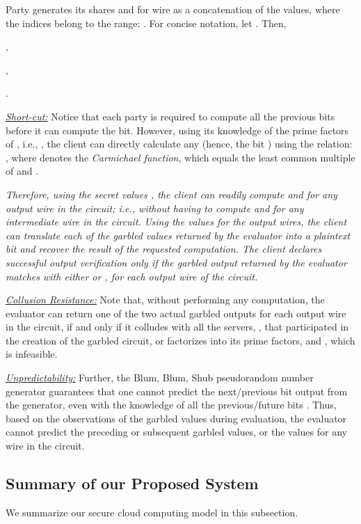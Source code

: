\documentclass[10pt,journal,cspaper,compsoc]{IEEEtran}
\begin{document}
Party  generates its shares  and  for wire  as a concatenation of the  values, where the indices  belong to the range: . For concise notation, let . Then,


,


,


.


\underline{\em Short-cut:} Notice that each party  is required to compute all the previous  bits before it can compute the  bit. However, using its knowledge of the prime factors of , i.e., , the client can directly calculate any  (hence, the bit ) using the relation: , where  denotes the {\em Carmichael function}, which equals the least common multiple of  and .


{\em Therefore, using the secret values , the client can readily compute  and  for any output wire  in the circuit; i.e., without having to compute  and  for any intermediate wire in the circuit. Using the  values for the output wires, the client can translate each of the garbled values returned by the evaluator  into a plaintext bit and recover the result of the requested computation. The client declares successful output verification only if the garbled output returned by the evaluator matches with either  or , for each output wire  of the circuit.}


\underline{\em Collusion Resistance:} Note that, without performing any computation, the evaluator can return one of the two actual garbled outputs for each output wire in the circuit, if and only if it colludes with all the  servers, , that participated in the creation of the garbled circuit, or factorizes  into its prime factors,  and , which is infeasible.


\underline{\em Unpredictability:} Further, the Blum, Blum, Shub pseudorandom number generator guarantees that one cannot predict the next/previous bit output from the generator, even with the knowledge of all the previous/future bits \cite{blum86,schneier95}. Thus, based on the observations of the garbled values during evaluation, the evaluator cannot predict the preceding or subsequent garbled values, or the  values for any wire in the circuit.


\subsection{Summary of our Proposed System}
\label{sec_our_secure_cloud_computing_model_summary}
We summarize our secure cloud computing model in this subsection.
\end{document}
